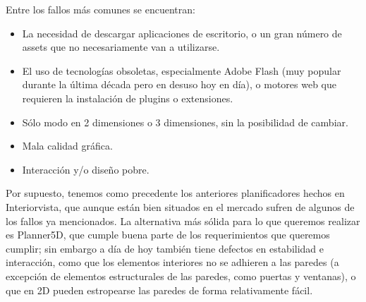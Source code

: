 Entre los fallos más comunes se encuentran:
\begin{itemize}
    \item La necesidad de descargar aplicaciones de escritorio, o un gran número de assets que no necesariamente van a utilizarse.
    \item El uso de tecnologías obsoletas, especialmente Adobe Flash (muy popular durante la última década pero en desuso hoy en día), o motores web que requieren la instalación de plugins o extensiones.
    \item Sólo modo en 2 dimensiones o 3 dimensiones, sin la posibilidad de cambiar.
    \item Mala calidad gráfica.
    \item Interacción y/o diseño pobre.
\end{itemize}

Por supuesto, tenemos como precedente los anteriores planificadores hechos en Interiorvista, que aunque están bien situados en el mercado sufren de algunos de los fallos ya mencionados. La alternativa más sólida para lo que queremos realizar es Planner5D, que cumple buena parte de los requerimientos que queremos cumplir; sin embargo a día de hoy también tiene defectos en estabilidad e interacción, como que los elementos interiores no se adhieren a las paredes (a excepción de elementos estructurales de las paredes, como puertas y ventanas), o que en 2D pueden estropearse las paredes de forma relativamente fácil.


